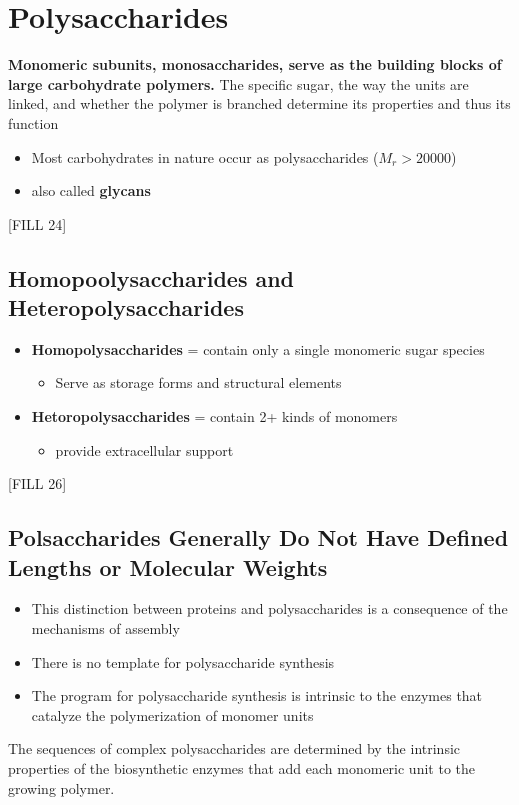 \documentclass[10pt]{article}
\begin{document}
\section*{Polysaccharides}
\textbf{Monomeric subunits, monosaccharides, serve as the building blocks of large carbohydrate polymers.}  The specific sugar, the way the units are linked, and whether the polymer is branched determine its properties and thus its function
\begin{itemize}
    \item Most carbohydrates in nature occur as polysaccharides ($M_r > 20000$)
    \item also called \textbf{glycans}
\end{itemize}
\begin{center}
    [FILL 24]
\end{center}

\subsection*{Homopoolysaccharides and Heteropolysaccharides}
\begin{itemize}
    \item \textbf{Homopolysaccharides} = contain only a single monomeric sugar species
    \begin{itemize}
        \item Serve as storage forms and structural elements
    \end{itemize}
    \item \textbf{Hetoropolysaccharides} = contain 2+ kinds of monomers
    \begin{itemize}
        \item provide extracellular support
    \end{itemize}
\end{itemize}
\begin{center}
    [FILL 26]
\end{center}

\subsection*{Polsaccharides Generally Do Not Have Defined Lengths or Molecular Weights}
\begin{itemize}
    \item This distinction between proteins and polysaccharides is a consequence of the mechanisms of assembly
    \item There is no template for polysaccharide synthesis
    \item The program for polysaccharide synthesis is intrinsic to the enzymes that catalyze the polymerization of monomer units
\end{itemize}
The sequences of complex polysaccharides are determined by the intrinsic properties of the biosynthetic enzymes that add each monomeric unit to the growing polymer.
\end{document}
